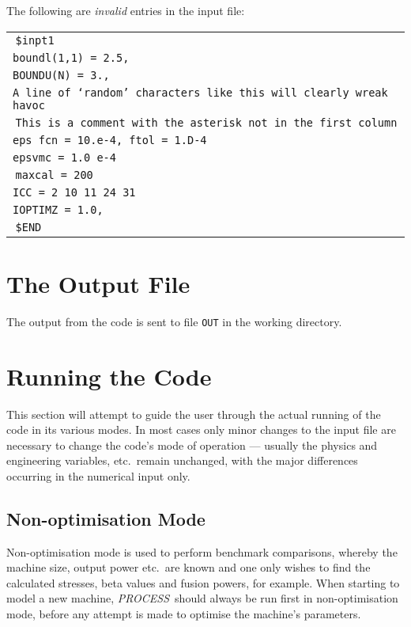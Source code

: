 \documentclass[11pt,a4paper]{report}
\newcommand{\PS}{\mbox{\it PROCESS\/ }}
\begin{document}
The following are {\em invalid}\/ entries in the input file:
\begin{center}
\begin{tabular}{||l}
$\:$\tt \$inpt1                          \\ %
$\!\!$\tt boundl(1,1) = 2.5,             \\
$\!\!$\tt BOUNDU(N) = 3.,                \\
$\!\!$\tt A line of `random' characters like this will clearly wreak havoc\\
$\:$\tt * This is a comment with the asterisk not in the first column\\
$\!\!$\tt eps fcn = 10.e-4, ftol = 1.D-4 \\
$\!\!$\tt epsvmc = 1.0 e-4               \\
$\:$\tt maxcal = 200                     \\
$\!\!$\tt ICC =   2  10  11  24  31      \\
$\!\!$\tt IOPTIMZ = 1.0,                 \\
$\:$\tt \$END                            \\ %
\end{tabular}
\end{center}

\section{The Output File}

The output from the code is sent to file \texttt{OUT} in the working
directory.

\section{Running the Code}

This section will attempt to guide the user through the actual running of the
code in its various modes. In most cases only minor changes to the input file
are necessary to change the code's mode of operation --- usually the physics
and engineering variables, etc.\ remain unchanged, with the major differences
occurring in the numerical input only.

\subsection{Non-optimisation Mode}

Non-optimisation mode is used to perform benchmark comparisons, whereby the
machine size, output power etc.\ are known and one only wishes to find the
calculated stresses, beta values and fusion powers, for example. When starting
to model a new machine, \PS should always be run first in non-optimisation
mode, before any attempt is made to optimise the machine's parameters.
\end{document}
